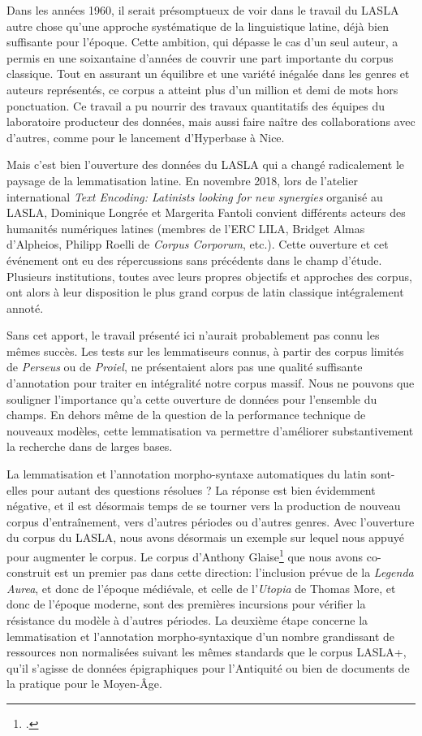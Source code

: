 Dans les années 1960, il serait présomptueux de voir dans le travail du LASLA autre chose qu'une approche systématique de la linguistique latine, déjà bien suffisante pour l'époque. Cette ambition, qui dépasse le cas d'un seul auteur, a permis en une soixantaine d'années de couvrir une part importante du corpus classique. Tout en assurant un équilibre et une variété inégalée dans les genres et auteurs représentés, ce corpus a atteint plus d'un million et demi de mots hors ponctuation. Ce travail a pu nourrir des travaux quantitatifs des équipes du laboratoire producteur des données, mais aussi faire naître des collaborations avec d'autres, comme pour le lancement d'Hyperbase à Nice.

Mais c'est bien l'ouverture des données du LASLA qui a changé radicalement le paysage de la lemmatisation latine. En novembre 2018, lors de l'atelier international \textit{Text Encoding: Latinists looking for new synergies} organisé au LASLA, Dominique Longrée et Margerita Fantoli convient différents acteurs des humanités numériques latines (membres de l'ERC LILA, Bridget Almas d'Alpheios, Philipp Roelli de \textit{Corpus Corporum}, etc.). Cette ouverture et cet événement ont eu des répercussions sans précédents dans le champ d'étude. Plusieurs institutions, toutes avec leurs propres objectifs et approches des corpus, ont alors à leur disposition le plus grand corpus de latin classique intégralement annoté.

Sans cet apport, le travail présenté ici n'aurait probablement pas connu les mêmes succès. Les tests sur les lemmatiseurs connus, à partir des corpus limités de \textit{Perseus} ou de \textit{Proiel}, ne présentaient alors pas une qualité suffisante d'annotation pour traiter en intégralité notre corpus massif. Nous ne pouvons que souligner l'importance qu'a cette ouverture de données pour l'ensemble du champs. En dehors même de la question de la performance technique de nouveaux modèles, cette lemmatisation va permettre d'améliorer substantivement la recherche dans de larges bases.

La lemmatisation et l'annotation morpho-syntaxe automatiques du latin sont-elles pour autant des questions résolues ? La réponse est bien évidemment négative, et il est désormais temps de se tourner vers la production de nouveau corpus d'entraînement, vers d'autres périodes ou d'autres genres. Avec l'ouverture du corpus du LASLA, nous avons désormais un exemple sur lequel nous appuyé pour augmenter le corpus. Le corpus d'Anthony Glaise\footcite{glaise_2020_corpus_tardif} que nous avons co-construit est un premier pas dans cette direction: l'inclusion prévue de la \textit{Legenda Aurea}, et donc de l'époque médiévale, et celle de l'\textit{Utopia} de Thomas More, et donc de l'époque moderne, sont des premières incursions pour vérifier la résistance du modèle à d'autres périodes. La deuxième étape concerne la lemmatisation et l'annotation morpho-syntaxique d'un nombre grandissant de ressources non normalisées suivant les mêmes standards que le corpus LASLA+, qu'il s'agisse de données épigraphiques pour l'Antiquité ou bien de documents de la pratique pour le Moyen-Âge.
